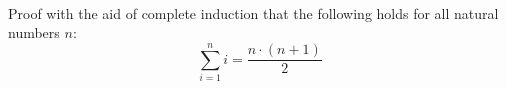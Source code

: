  \\
Proof with the aid of complete induction that the following holds for all
natural numbers $n$:
\begin{displaymath}
  \sum\limits^{n}_{i=1} i = \frac{n \cdot (n+1)}{2}
\end{displaymath}